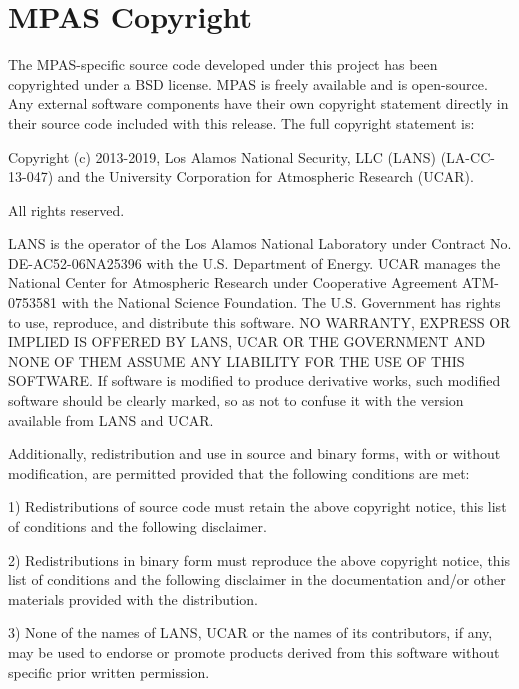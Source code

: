 
\chapter{MPAS Copyright}

{\parindent=0pt  \parskip=5pt

The MPAS-specific source code developed under this project has been copyrighted under a BSD license.  MPAS is freely available and is open-source.  Any external software components have their own copyright statement directly in their source code included with this release.  The full copyright statement is:

Copyright (c) 2013-2019,  Los Alamos National Security, LLC (LANS) (LA-CC-13-047)
and the University Corporation for Atmospheric Research (UCAR).   

All rights reserved. 

LANS is the operator of the Los Alamos National Laboratory under Contract No.
DE-AC52-06NA25396 with the U.S. Department of Energy.  UCAR manages the National
Center for Atmospheric Research under Cooperative Agreement ATM-0753581 with the
National Science Foundation.  The U.S. Government has rights to use, reproduce,
and distribute this software.  NO WARRANTY, EXPRESS OR IMPLIED IS OFFERED BY
LANS, UCAR OR THE GOVERNMENT AND NONE OF THEM ASSUME ANY LIABILITY FOR THE USE
OF THIS SOFTWARE.  If software is modified to produce derivative works, such
modified software should be clearly marked, so as not to confuse it with the
version available from LANS and UCAR.

Additionally, redistribution and use in source and binary forms, with or without
modification, are permitted provided that the following conditions are met:

1) Redistributions of source code must retain the above copyright notice, this
list of conditions and the following disclaimer.

2) Redistributions in binary form must reproduce the above copyright notice,
this list of conditions and the following disclaimer in the documentation and/or
other materials provided with the distribution.

3) None of the names of LANS, UCAR or the names of its contributors, if any, may
be used to endorse or promote products derived from this software without
specific prior written permission.

}
